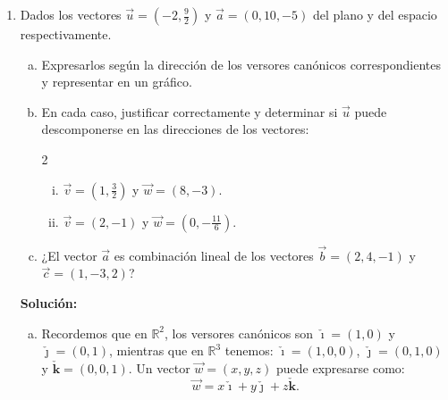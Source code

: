\documentclass[11pt,a4paper]{article}
\newcommand{\iv}{\bm{\check{\imath}}}
\newcommand{\jv}{\bm{\check{\jmath}}}
\newcommand{\kv}{\check{\bm k}}
\begin{document}
\begin{enumerate}[\hspace{-5mm} 1) ]
\item  Dados los vectores $\vec{u} = \left(-2, \tfrac{9}{2} \right)$ y $\vec{a} = (0, 10, -5)$ del plano y del espacio respectivamente.

\begin{enumerate}[a)]
    \item Expresarlos según la dirección de los versores canónicos correspondientes y representar en un gráfico.

    \item En cada caso, justificar correctamente y determinar si $\vec{u}$ puede descomponerse en las direcciones de los vectores: \quad\qquad \begin{minipage}{.7\textwidth}\begin{multicols}{2}
    \begin{enumerate}[i)]
        \item $\vec{v} = \left(1, \tfrac{3}{2} \right)$ y $\vec{w} = (8, -3)$.
        \item $\vec{v} = (2, -1)$ y $\vec{w} = \left(0, -\tfrac{11}{6} \right)$.
    \end{enumerate}    
    \end{multicols}    
    \end{minipage}   

    \item ¿El vector $\vec{a}$ es combinación lineal de los vectores $\vec{b} = (2, 4, -1)$ y $\vec{c} = (1, -3, 2)$?
\end{enumerate}








\textbf{Solución:}  

\begin{enumerate}[a)]
    \item Recordemos que en $\mathbb{R}^2$, los versores canónicos son $\iv = (1, 0)$ y $\jv = (0, 1)$, mientras que en $\mathbb{R}^3$ tenemos: $\iv = (1, 0,0)$,  $\jv = (0, 1,0)$ y $\kv = (0, 0, 1)$. Un vector $\vec{w} = (x, y, z)$ puede expresarse como:
\[
\vec{w} = x\iv + y\jv + z\kv.
\]

\begin{enumerate}[a)]
\end{enumerate}
\end{enumerate}
\end{enumerate}
\end{document}
